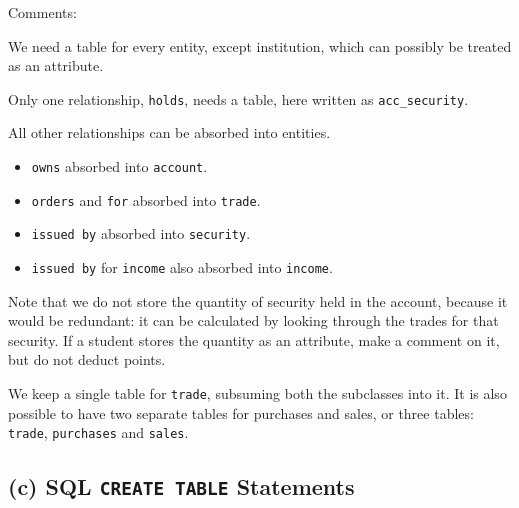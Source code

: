 Comments:

We need a table for every entity, except institution, which can possibly be treated as an attribute.

Only one relationship, \texttt{holds}, needs a table, here written as \texttt{acc\_security}.

All other relationships can be absorbed into entities.
\begin{itemize}
  \item \texttt{owns} absorbed into \texttt{account}.
  \item \texttt{orders} and \texttt{for} absorbed into \texttt{trade}.
  \item \texttt{issued by} absorbed into \texttt{security}.
  \item \texttt{issued by} for \texttt{income} also absorbed into \texttt{income}.
\end{itemize}

Note that we do not store the quantity of security held in the account, because it would be redundant: it can be calculated by looking through the trades for that security. If a student stores the quantity as an attribute, make a comment on it, but do not deduct points.

We keep a single table for \texttt{trade}, subsuming both the subclasses into it. It is also possible to have two separate tables for purchases and sales, or three tables: \texttt{trade}, \texttt{purchases} and \texttt{sales}.

\subsection*{(c) SQL \texttt{CREATE TABLE} Statements}

